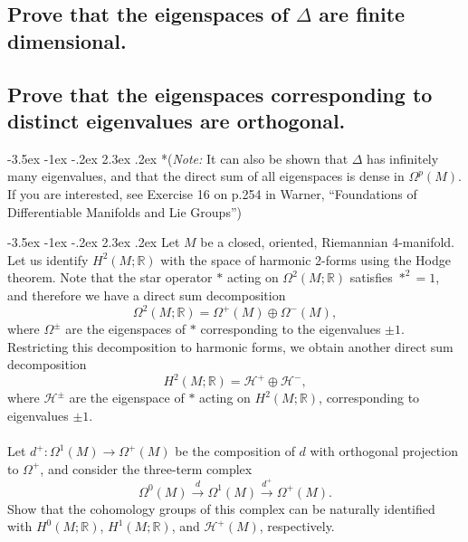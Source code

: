 \documentclass[10pt]{article}
\makeatletter
\renewcommand\section{\@startsection{section}{1}{\z@}%
                                  {-3.5ex \@plus -1ex \@minus -.2ex}%
                                  {2.3ex \@plus.2ex}%
                                  {\normalfont\large\bfseries}}
\newcommand{\R}{\ensuremath{\mathbb{R}}}
\DeclareMathOperator{\2}{II}
\newcommand{\note}[1]{{(\emph{Note:} #1)}} %
\makeatother
\begin{document}
\subsection{Prove that the eigenspaces of $\Delta$ are finite dimensional.}
\subsection{Prove that the eigenspaces corresponding to distinct eigenvalues are orthogonal.}
\section*{\note{It can also be shown that $\Delta$ has infinitely many eigenvalues, and that the direct sum of all eigenspaces is dense in $\Omega^p(M)$. If you are interested, see Exercise 16 on p.254 in Warner, ``Foundations of Differentiable Manifolds and Lie Groups''}}

\section{Let $M$ be a closed, oriented, Riemannian 4-manifold. Let us identify $H^2(M; \R)$ with the space of harmonic 2-forms using the Hodge theorem. Note that the star operator $*$ acting on $\Omega^2(M; \R)$ satisfies $*^2 =1$, and therefore we have a direct sum decomposition $$\Omega^2(M; \R) = \Omega^+(M) \oplus \Omega^- (M),$$ where $\Omega^\pm$ are the eigenspaces of $*$ corresponding to the eigenvalues $\pm 1$. Restricting this decomposition to harmonic forms, we obtain another direct sum decomposition $$H^2(M; \R) = \mathcal{H}^+ \oplus \mathcal{H}^-,$$ where $\mathcal{H}^\pm$ are the eigenspace of $*$ acting on $H^2(M; \R)$, corresponding to eigenvalues $\pm 1$. \\\\ Let $d^+ : \Omega^1(M) \to \Omega^+(M)$ be the composition of $d$ with orthogonal projection to $\Omega^+$, and consider the three-term complex $$\Omega^0(M) \stackrel{d}{\to} \Omega^1(M) \stackrel{d^+}{\to} \Omega^+(M).$$ Show that the cohomology groups of this complex can be naturally identified with $H^0(M; \R)$, $H^1(M; \R)$, and $\mathcal{H}^+(M)$, respectively.}
\end{document}
